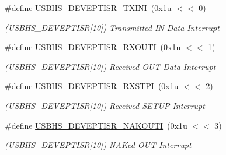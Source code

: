 \begin{DoxyCompactItemize}
\mbox{\label{group__SAMV71__USBHS_ga90f3eb46b67012a13277f7fa34a433d9}} 
\#define \mbox{\hyperlink{group__SAMV71__USBHS_ga90f3eb46b67012a13277f7fa34a433d9}{U\+S\+B\+H\+S\+\_\+\+D\+E\+V\+E\+P\+T\+I\+S\+R\+\_\+\+T\+X\+I\+NI}}~(0x1u $<$$<$ 0)
\begin{DoxyCompactList}\small\item\em (U\+S\+B\+H\+S\+\_\+\+D\+E\+V\+E\+P\+T\+I\+SR\mbox{[}10\mbox{]}) Transmitted IN Data Interrupt \end{DoxyCompactList}\item 
\mbox{\label{group__SAMV71__USBHS_ga0cb192d6efb653c28e962175c389896a}} 
\#define \mbox{\hyperlink{group__SAMV71__USBHS_ga0cb192d6efb653c28e962175c389896a}{U\+S\+B\+H\+S\+\_\+\+D\+E\+V\+E\+P\+T\+I\+S\+R\+\_\+\+R\+X\+O\+U\+TI}}~(0x1u $<$$<$ 1)
\begin{DoxyCompactList}\small\item\em (U\+S\+B\+H\+S\+\_\+\+D\+E\+V\+E\+P\+T\+I\+SR\mbox{[}10\mbox{]}) Received O\+UT Data Interrupt \end{DoxyCompactList}\item 
\mbox{\label{group__SAMV71__USBHS_ga612669600cec1778ab5e97f869aee53b}} 
\#define \mbox{\hyperlink{group__SAMV71__USBHS_ga612669600cec1778ab5e97f869aee53b}{U\+S\+B\+H\+S\+\_\+\+D\+E\+V\+E\+P\+T\+I\+S\+R\+\_\+\+R\+X\+S\+T\+PI}}~(0x1u $<$$<$ 2)
\begin{DoxyCompactList}\small\item\em (U\+S\+B\+H\+S\+\_\+\+D\+E\+V\+E\+P\+T\+I\+SR\mbox{[}10\mbox{]}) Received S\+E\+T\+UP Interrupt \end{DoxyCompactList}\item 
\mbox{\label{group__SAMV71__USBHS_gae9b85a13a7b3e767ea4ff4480ffc4aa4}} 
\#define \mbox{\hyperlink{group__SAMV71__USBHS_gae9b85a13a7b3e767ea4ff4480ffc4aa4}{U\+S\+B\+H\+S\+\_\+\+D\+E\+V\+E\+P\+T\+I\+S\+R\+\_\+\+N\+A\+K\+O\+U\+TI}}~(0x1u $<$$<$ 3)
\begin{DoxyCompactList}\small\item\em (U\+S\+B\+H\+S\+\_\+\+D\+E\+V\+E\+P\+T\+I\+SR\mbox{[}10\mbox{]}) N\+A\+Ked O\+UT Interrupt \end{DoxyCompactList}\item 
\mbox{\label{group__SAMV71__USBHS_ga529fa6ed28b70b37d2fe4ab6e84f172a}} 

\end{DoxyCompactItemize}
